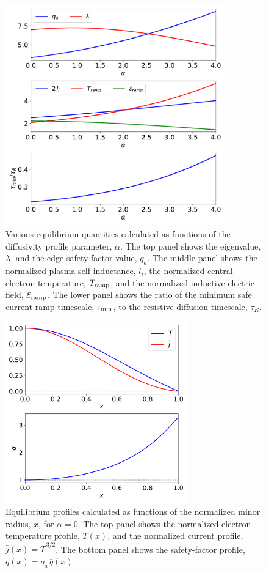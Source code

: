\documentclass[12pt,prb,aps]{revtex4-1}
\begin{document}
\begin{figure}
\centerline{\includegraphics[width=0.85\textwidth]{Figure2.pdf}}
\caption{Various equilibrium quantities calculated as functions of the diffusivity profile parameter, $\alpha$.
The top panel shows the eigenvalue, $\lambda$, and the edge safety-factor value, $q_a$. 
The middle panel shows the normalized plasma self-inductance, $l_i$, the normalized central electron temperature, $T_{\rm ramp}$,
and the normalized inductive electric field, ${\cal E}_{\rm ramp}$. The lower panel shows the ratio of the minimum safe current ramp
timescale, $\tau_{\rm min}$, to the resistive diffusion timescale, $\tau_R$. }\label{fig2}
\end{figure}

\begin{figure}
\centerline{\includegraphics[width=0.7\textwidth]{Figure3.pdf}}
\caption{Equilibrium profiles calculated as functions of the normalized minor radius, $x$, for $\alpha=0$.  The top panel shows the normalized electron temperature profile, $\bar{T}(x)$, and the
normalized current profile, $\bar{j}(x)= \bar{T}^{\,3/2}$.  The bottom panel shows the safety-factor profile, $q(x)= q_a\,\bar{q}(x)$. }\label{fig3}
\end{figure}
\end{document}
